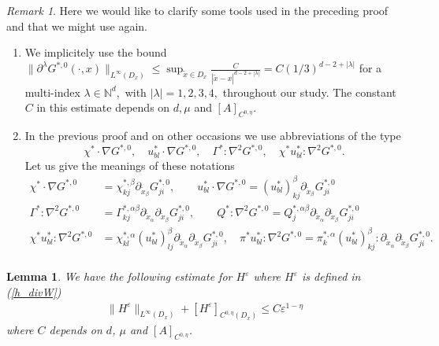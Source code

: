\documentclass[11pt, reqno]{amsart}
\newtheorem{lemma}[theorem]{Lemma}
\theoremstyle{definition}
\theoremstyle{remark}
\newtheorem{remark}[theorem]{Remark}
\numberwithin{equation}{section}
\begin{document}
	\begin{remark}\label{bound_inf_derG0} Here we would like to clarify some tools used in the preceding proof and that we might use again.
		\begin{enumerate}
			\item We implicitely use the bound $\|\partial^\lambda G^{*,0}(\cdot,x) \|_{L^\infty(D_x)} \leq \sup_{\tilde{x}\in D_x} \frac{C}{|\tilde{x} -x|^{d-2+|\lambda|}} =C(1/3)^{d-2+|\lambda|}$ for a multi-index $\lambda\in \mathbb{N}^d,$ with $|\lambda|=1,2,3,4,$ throughout our study. The  constant $C $ in this estimate depends on $d, \mu$ and $[A]_{C^{0,\eta}}.$
			\item In the previous  proof and on other occasions we use abbreviations of the type $$ \chi^*\cdot \nabla G^{*,0},\quad    u_{bl}^* \cdot \nabla G^{*,0},\quad \Gamma^*:\nabla^2 G^{*,0},\quad \chi^* u_{bl}^*: \nabla^2 G^{*,0}.$$
			\noindent	Let us give the meanings	of these notations
			\begin{align*}
				\chi^*\cdot \nabla G^{*,0}&=\chi^{*,\beta}_{kj}\partial_{\tilde{x}_{\beta}} G_{ji}^{*,0} ,\qquad    u_{bl}^* \cdot \nabla G^{*,0}=(u^*_{bl})^{\beta}_{kj}\partial_{\tilde{x}_{\beta}} G_{ji}^{*,0} \\
				\Gamma^*:\nabla^2 G^{*,0}&=\Gamma^{*,\alpha\beta}_{kj}\partial_{ \tilde{x}_{\alpha}}\partial_{\tilde{x}_{\beta}} G_{ji}^{*,0}  , \qquad   Q^*:\nabla^2 G^{*,0}=Q^{*,\alpha\beta}_{j}\partial_{ \tilde{x}_{\alpha}}\partial_{\tilde{x}_{\beta}} G_{ji}^{*,0} \\ \chi^* u_{bl}^*: \nabla^2 G^{*,0}&=		\chi^{*,\alpha}_{kl}(u^*_{bl})^{\beta}_{lj}	\partial_{ \tilde{x}_{\alpha}}\partial_{\tilde{x}_{\beta}}G_{ji}^{*,0},\quad   \pi^{*}	u_{bl}^{*}:\nabla^2 G_{}^{*,0} =\pi^{*,\alpha}_{k}	(u^*_{bl})^{\beta}_{kj}	:\partial_{ \tilde{x}_{\alpha}}\partial_{\tilde{x}_{\beta}}G_{ji}^{*,0} .\\
			\end{align*}
			
		\end{enumerate} 
	\end{remark}
	\begin{lemma}
		We have the following estimate for $H^\varepsilon$ where $H^\varepsilon$ is defined in \textup{(\ref{h_divW})}
		\begin{align*}
			\| H^\varepsilon \|_{L^\infty(D_x)} +  [H^\varepsilon]_{C^{0,\eta}(D_x)} \leq   C  \varepsilon^{1-\eta}
		\end{align*}where $C $ depends on $d$, $\mu$ and $[A]_{C^{0,\eta}}$.
	\end{lemma}
\end{document}
